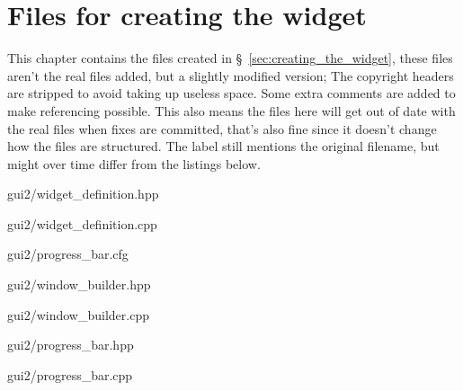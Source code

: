 \chapter{Files for creating the widget}

This chapter contains the files created in \S~\ref{sec:creating_the_widget}, these
files aren't the real files added, but a slightly modified version; The
copyright headers are stripped to avoid taking up useless space. Some extra
comments are added to make referencing possible. This also means the files here
will get out of date with the real files when fixes are committed, that's also
fine since it doesn't change how the files are structured. The label still
mentions the original filename, but might over time differ from the listings
below.


	{gui2/widget_definition.hpp}

\pagebreak

	{gui2/widget_definition.cpp}

\pagebreak

	{gui2/progress_bar.cfg}

\pagebreak

	{gui2/window_builder.hpp}


	{gui2/window_builder.cpp}


	{gui2/progress_bar.hpp}

\pagebreak

	{gui2/progress_bar.cpp}


